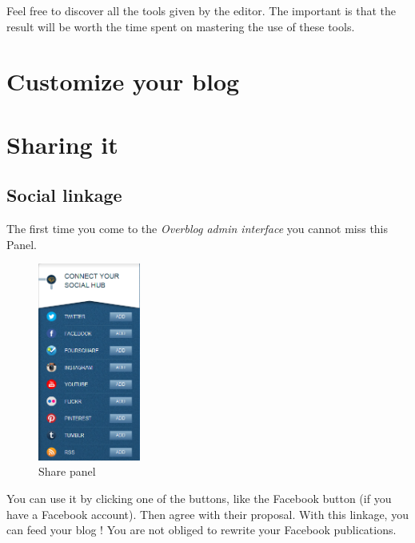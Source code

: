 \documentclass[a4paper,10pt]{article}
\begin{document}
Feel free to discover all the tools given by the editor. The important is that the result will be worth the time spent on mastering the use of these tools. 

\newpage
\section{Customize your blog}


\newpage
\section{Sharing it}

\subsection{Social linkage}

The first time you come to the  \emph{Overblog admin interface} you cannot miss this Panel.
\begin{figure}[h]
    \center
  \includegraphics[width=0.3\textwidth]{Images/shareIni.png}
    \caption{Share panel}
\end{figure}

You can use it by clicking one of the buttons, like the Facebook button (if you have a Facebook account). Then agree with their proposal. With this linkage, you can feed your blog ! You are not obliged to rewrite your Facebook publications.
\end{document}
